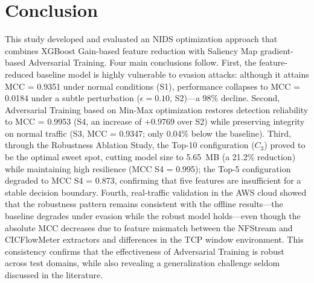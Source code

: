 \documentclass[11pt, a4paper]{article}
\begin{document}
\section{Conclusion}
This study developed and evaluated an NIDS optimization approach that combines XGBoost Gain-based feature reduction with Saliency Map gradient-based Adversarial Training. Four main conclusions follow. First, the feature-reduced baseline model is highly vulnerable to evasion attacks: although it attains MCC = 0.9351 under normal conditions (S1), performance collapses to MCC = 0.0184 under a subtle perturbation ($\epsilon = 0.10$, S2)---a 98\% decline. Second, Adversarial Training based on Min-Max optimization restores detection reliability to MCC = 0.9953 (S4, an increase of $+0.9769$ over S2) while preserving integrity on normal traffic (S3, MCC = 0.9347; only 0.04\% below the baseline). Third, through the Robustness Ablation Study, the Top-10 configuration ($C_3$) proved to be the optimal sweet spot, cutting model size to 5.65~MB (a 21.2\% reduction) while maintaining high resilience (MCC S4 = 0.995); the Top-5 configuration degraded to MCC S4 = 0.873, confirming that five features are insufficient for a stable decision boundary. Fourth, real-traffic validation in the AWS cloud showed that the robustness pattern remains consistent with the offline results---the baseline degrades under evasion while the robust model holds---even though the absolute MCC decreases due to feature mismatch between the NFStream and CICFlowMeter extractors and differences in the TCP window environment. This consistency confirms that the effectiveness of Adversarial Training is robust across test domains, while also revealing a generalization challenge seldom discussed in the literature.
\end{document}

